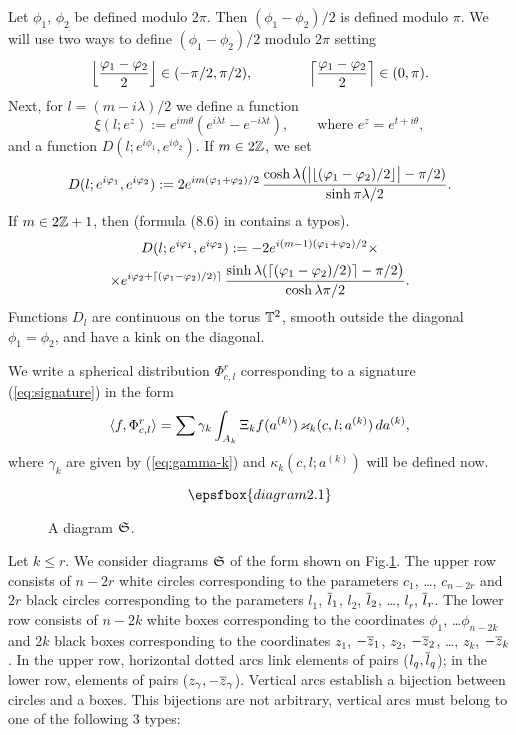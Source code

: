 \documentclass{article}
\begin{document}
Let
$\phi_1$, $\phi_2$ be defined modulo $2\pi$.
Then $(\phi_1-\phi_2)/2$ is defined modulo $\pi$.
We will use two ways to define $(\phi_1-\phi_2)/2$ modulo $2\pi$  setting
\begin{equation}
\Bigl\lfloor \frac {\phi_1-\phi_2}2 \Bigr\rfloor\in (-\pi/2,\pi/2),
\qquad \qquad
\Bigl\lceil \frac {\phi_1-\phi_2}2 \Bigr\rceil\in (0,\pi).
\label{eq:floor}
\end{equation}
Next, for $l=(m-i\lambda)/2$ we define a function
\begin{equation}
 \xi(l;e^z):=e^{im\theta}(e^{i\lambda t}- e^{-i\lambda t}), \qquad \text{where $e^z=e^{t+i\theta}$},
 \label{eq:xi}
\end{equation}
and a function $D(l;e^{i\phi_1},e^{i\phi_2})$. If $m\in 2{\mathbb Z}$,
we set
\begin{equation}
 D(l;e^{i\varphi_1},e^{i\varphi_2}):=2 e^{im (\varphi_1+\varphi_2)/2} \,
 \frac{\cosh \lambda \bigl(\bigl|\lfloor (\varphi_1-\varphi_2)/2 \rfloor \bigr|-\pi/2) }
 {\sinh \pi\lambda/2}.
\end{equation}
If $m\in 2{\mathbb Z}+1$, then (formula (8.6) in \cite{San} contains a typos).
\begin{multline}
 D(l;e^{i\varphi_1},e^{i\varphi_2}):=-2 e^{i(m-1) (\varphi_1+\varphi_2)/2} 
  \times\\\times
 e^{i\varphi_2+\lceil (\varphi_1-\varphi_2)/2)\rceil}\,
 \frac{\sinh \lambda(\lceil (\varphi_1-\varphi_2)/2)\rceil-\pi/2\bigr)}
 {\cosh \lambda\pi/2}
 .
\end{multline}
Functions $D_l$ are continuous on the torus $\mathbb T^2$, smooth outside the diagonal 
$\phi_1=\phi_2$,
and have a kink on the diagonal.

We write a spherical distribution $\Phi^r_{c,l}$ corresponding to a signature
(\ref{eq:signature}) in the form
\begin{equation}
\la f, \Phi^r_{c,l}\ra=  \sum 
\gamma_k \int_{A_k} \Xi_k f(a^{(k)})\, \kappa_k(c,l;a^{(k)})\, da^{(k)}
\label{eq:Phi}
,\end{equation}
where
$\gamma_k$ are given by (\ref{eq:gamma-k})  and 
$\kappa_k(c,l;a^{(k)})$ will be defined now.

\begin{figure}
$$
\epsfbox{diagram2.1}
$$
\caption{A diagram $\mathfrak S$.\label{f:diagram}}
\end{figure}





Let $k\le r$. We consider diagrams
$\mathfrak S$ of
the form shown on Fig.\ref{f:diagram}.
The upper row consists of $n-2r$ white circles corresponding to the parameters 
$c_1$, \dots, $c_{n-2r}$ and $2r$ black circles corresponding to the parameters
$l_1$, $\overline l_1$, $l_2$, $\overline l_2$, \dots, $l_r$, $\overline l_r$. 
The lower row consists of $n-2k$ white boxes corresponding to the coordinates
$\phi_1$, \dots $\phi_{n-2k}$ and 
$2k$ black boxes corresponding to the coordinates $z_1$, $-\overline z_1$,  $z_2$, $-\overline z_2$,
\dots, $z_k$, $-\overline z_k$.
In the upper row,
horizontal dotted arcs link elements of pairs ($l_q,\overline l_q$);
in the lower row, elements of 
pairs ($z_\gamma, -\overline z_\gamma$).
Vertical arcs establish a bijection between  
circles  and a boxes. This bijections are not arbitrary,
vertical arcs must belong to one of the following 3 types:
\end{document}
